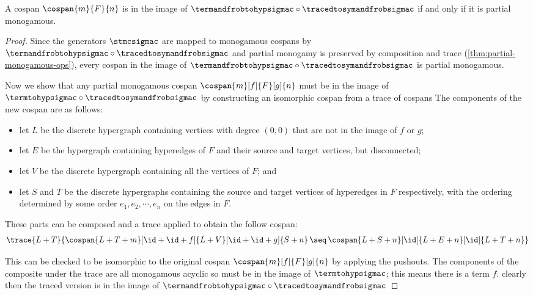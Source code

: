 \begin{theorem}\label{thm:termtohyp-image}
    A cospan \(\cospan{m}{F}{n}\) is in the image of \(
        \termandfrobtohypsigmac \circ \tracedtosymandfrobsigmac\) if
    and only if it is partial monogamous.
\end{theorem}
\begin{proof}
    Since the generators \(\stmcsigmac\) are mapped to monogamous cospans
    by \(\termandfrobtohypsigmac \circ \tracedtosymandfrobsigmac\) and partial
    monogamy is preserved by composition and trace
    (\cref{thm:partial-monogamous-ops}), every cospan in the image of
    \(\termandfrobtohypsigmac \circ \tracedtosymandfrobsigmac\) is partial
    monogamous.

    Now we show that any partial monogamous cospan \(
        \cospan{m}[f]{F}[g]{n}
    \) must be in the image of \(
        \termtohypsigmac \circ \tracedtosymandfrobsigmac
    \) by constructing an isomorphic cospan from a trace of cospans
    The components of the new cospan are as follows:
    \begin{itemize}
        \item let \(L\) be the discrete hypergraph containing vertices with
                degree
                \((0,0)\) that are not in the image of \(f\) or \(g\);
        \item let \(E\) be the hypergraph containing hyperedges of \(F\) and
                their source and target vertices, but disconnected;
        \item let \(V\) be the discrete hypergraph containing all the
                vertices of \(F\); and
        \item let \(S\) and \(T\) be the discrete hypergraphs containing
                the source and target vertices of hyperedges in \(F\)
                respectively, with the ordering determined by some order
                \(e_1,e_2,\cdots,e_n\) on the edges in \(F\).
    \end{itemize}

    These parts can be composed and a trace applied to obtain the follow
    cospan:
    \begin{gather*}
        \trace{L + T}{
            \cospan{L + T + m}[\id + \id + f]{L + V}[\id + \id + g]{S + n}
            \,\seq\,
            \cospan{L + S + n}[\id]{L + E + n}[\id]{L + T + n}
        }
        \label{gat:cospan}
    \end{gather*}

    This can be checked to be isomorphic to the original cospan
    \(\cospan{m}[f]{F}[g]{n}\) by applying the pushouts.
    The components of the composite under the trace are all monogamous acyclic
    so must be in the image of \(\termtohypsigmac\); this means there is a term
    \(f\). clearly then the traced
    version is in the image of
    \(\termandfrobtohypsigmac \circ \tracedtosymandfrobsigmac\)
\end{proof}

